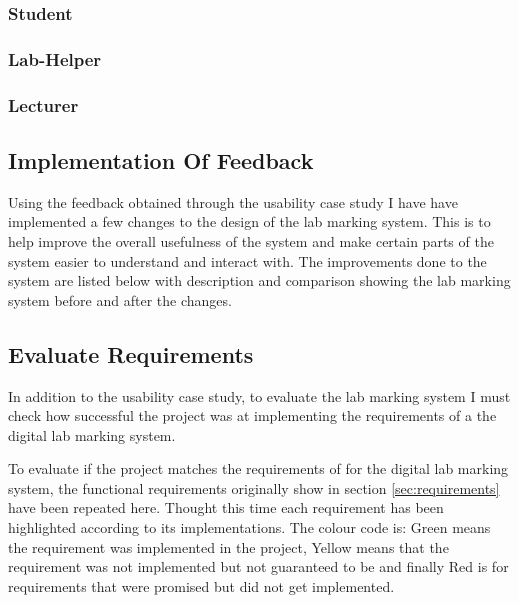 \documentclass[12pt]{article}  %
\begin{document}
\subsubsection*{Student}

\subsubsection*{Lab-Helper}

\subsubsection*{Lecturer}

\subsection{Implementation Of Feedback}

Using the feedback obtained through the usability case study I have have implemented a few changes to the design of the lab marking system. This is to help improve the overall usefulness of the system and make certain parts of the system easier to understand and interact with. The improvements done to the system are listed below with description and comparison showing the lab marking system before and after the changes.  


\subsection{Evaluate Requirements}

In addition to the usability case study, to evaluate the lab marking system I must check how successful the project was at implementing the requirements of a the digital lab marking system. 

To evaluate if the project matches the requirements of for the digital lab marking system, the functional requirements originally show in section \ref{sec:requirements} have been repeated here. Thought this time each requirement has been highlighted according to its implementations. The colour code is: Green means the requirement was implemented in the project, Yellow means that the requirement was not implemented but not guaranteed to be and finally Red is for requirements that were promised but did not get implemented.   
\end{document}
